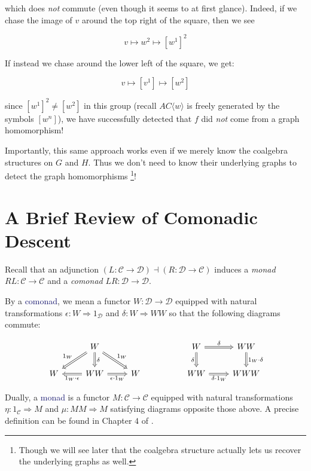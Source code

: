 \documentclass[12pt]{article}
\theoremstyle{definition}
\theoremstyle{theorem}
\newcommand*{\catVarFont}[1]{\mathcal{#1}}
\newcommand{\catC}{\catVarFont{C}}
\newcommand{\catD}{\catVarFont{D}}
\newcommand*{\important}[1]{\textcolor{MidnightBlue}{#1}}
\begin{document}
which does \emph{not} commute (even though it seems to at first glance). 
Indeed, if we chase the image of $v$ around the top right of the square, then 
we see

\[ v \mapsto w^2 \mapsto [w^1]^2 \]

If instead we chase around the lower left of the square, we get:

\[ v \mapsto [v^1] \mapsto [w^2] \]

since $[w^1]^2 \neq [w^2]$ in this group (recall $AC \langle w \rangle$ is 
freely generated by the symbols $[w^n]$), we have successfully detected that 
$f$ did \emph{not} come from a graph homomorphism!

Importantly, this same approach works even if we merely know the 
coalgebra structures on $G$ and $H$. Thus we don't need to know their
underlying graphs to detect the graph homomorphisms%
\footnote{Though we will see later that the coalgebra structure 
actually lets us recover the underlying graphs as well.}! 

\section{A Brief Review of Comonadic Descent}
\label{review}

Recall that an adjunction
$(L : \catC \to \catD) \dashv (R : \catD \to \catC)$
induces a \emph{monad} $RL : \catC \to \catC$ and a \emph{comonad}
$LR : \catD \to \catD$.

By a \important{comonad}, we mean a functor $W : \catD \to \catD$ equipped with natural
transformations $\epsilon : W \Rightarrow 1_\catD$ and $\delta : W \Rightarrow WW$
so that the following diagrams commute:

\[
    \begin{tikzcd}
    & W &&& W & WW \\
    W & WW & W && WW & WWW
    \arrow["{1_W \cdot \epsilon}", Rightarrow, from=2-2, to=2-1]
    \arrow["{\epsilon \cdot 1_W}"', Rightarrow, from=2-2, to=2-3]
    \arrow["\delta", Rightarrow, from=1-2, to=2-2]
    \arrow["{1_W}"', Rightarrow, from=1-2, to=2-1]
    \arrow["{1_W}", Rightarrow, from=1-2, to=2-3]
    \arrow["\delta"', Rightarrow, from=1-5, to=2-5]
    \arrow["\delta", Rightarrow, from=1-5, to=1-6]
    \arrow["{\delta \cdot 1_W}"', Rightarrow, from=2-5, to=2-6]
    \arrow["{1_W \cdot \delta}", Rightarrow, from=1-6, to=2-6]
    \end{tikzcd}
\]

Dually, a \important{monad} is a functor $M : \catC \to \catC$ equipped with 
natural transformations $\eta : 1_\catC \Rightarrow M$ and 
$\mu : MM \Rightarrow M$ satisfying diagrams opposite those above. A precise
definition can be found in Chapter $4$ of \cite{borceuxCategoriesStructures1994}.
\end{document}
